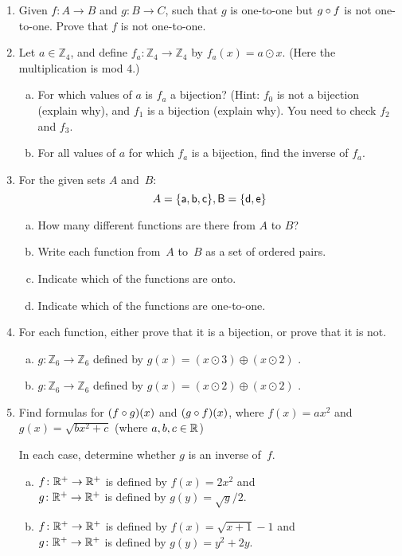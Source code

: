 \begin{enumerate}
\item
Given $f : A \rightarrow B$ and $g : B \rightarrow C$, such that $g$  is one-to-one  but  $g \circ f$  is not one-to-one. Prove that $f$ is not one-to-one.

\item
Let $a \in \mathbb{Z}_4$, and define $f_a \colon \mathbb{Z}_4 \to \mathbb{Z}_4$ by $f_a(x) = a \odot x$.  (Here the multiplication is mod 4.) 
\begin{enumerate}[(a)]
\item \label{LinearWhenBijectionExer-not0}
For which values of $a$  is $f_a$ a bijection? (Hint: $f_0$ is not a bijection (explain why), and $f_1$ is a bijection (explain why).  You need to check $f_2$ and $f_3$.
\item \label{LinearWhenBijectionExer-0}
For all values of $a$ for which $f_a$ is a bijection, find the inverse of $f_a$.
\end{enumerate}

\item
 For the given sets $A$ and~$B$:
\[ A = \{\sf{a},\sf{b},\sf{c}\}, B = \{\sf{d},\sf{e}\} \]
\begin{enumerate}[(a)] 
\item How many different functions are there from $A$ to $B$?
\item Write each function from~$A$ to~$B$ as a set of ordered pairs. 
\item  Indicate which of the functions are onto.
\item Indicate which of the functions are one-to-one.
\end{enumerate}

\item
For each function, either prove that it is a bijection, or prove that it is not.
\begin{enumerate}[(a)]
\item \label{modular9}
 $g \colon {\mathbb Z}_6 \to {\mathbb Z}_6$ defined by $g(x)= (x \odot 3) \oplus  (x \odot 2)$ .
\item \label{modular_m6}
 $g \colon {\mathbb Z}_6 \to {\mathbb Z}_6$ defined by $g(x) = (x \odot 2) \oplus (x \odot 2) $ .
 \end{enumerate}

\item
Find formulas for $(f \circ g)(x)$ and $(g \circ f)(x)$, where 
 $f(x) = ax^2 $ and $g(x) = \sqrt{b x^2 + c}$ (where $a,b,c \in \mathbb{R}$)

 In each case, determine whether $g$ is an inverse of~$f$.
 \begin{enumerate}[(a)]
 \item \label{VerifyInverseExers-(x^2)}
$f \colon \mathbb{R}^+ \to \mathbb{R}^+$ is defined by $f(x) =2x^2$ and 
 \\ $g \colon \mathbb{R}^+ \to \mathbb{R}^+$ is defined by $g(y) = \sqrt{y}/2$.
 \item \label{VerifyInverseExers-(sqrt(x+1)-1)}
$f \colon \mathbb{R}^+ \to \mathbb{R}^+$ is defined by $f(x) = \sqrt{x+1} - 1$ and 
 \\ $g \colon \mathbb{R}^+ \to \mathbb{R}^+$ is defined by $g(y) = y^2 + 2y$.
 \end{enumerate}




\end{enumerate}
